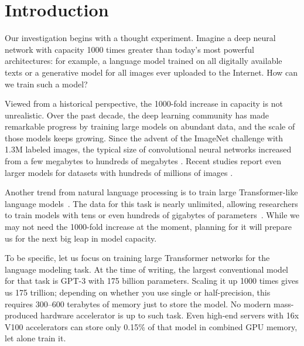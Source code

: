 \vspace{-12pt}
\section{Introduction}\label{sect:intro}
\vspace{-4pt}

Our investigation begins with a thought experiment. Imagine a deep neural network with capacity 1000 times greater than today's most powerful architectures: for example, a language model trained on all digitally available texts or a generative model for all images ever uploaded to the Internet. How can we train such a model?

\vspace{-1.5pt}

Viewed from a historical perspective, the 1000-fold increase in capacity is not unrealistic. Over the past decade, the deep learning community has made remarkable progress by training large models on abundant data, and the scale of those models keeps growing. Since the advent of the ImageNet challenge \cite{imagenet_cvpr09} with 1.3M labeled images, the typical size of convolutional neural networks increased from a few megabytes to hundreds of megabytes \cite{alexnet, resnet, huang2019gpipe}. Recent studies report even larger models for datasets with hundreds of millions of images \cite{kolesnikovlarge, jft300data}.

\vspace{-1.5pt}

Another trend from natural language processing is to train large Transformer-like language models~\cite{bert, roberta, kaplan2020scaling}. The data for this task is nearly unlimited, allowing researchers to train models with tens or even hundreds of gigabytes of parameters~\cite{brown2020language,shoeybi2019megatron,zellers2019defending,tnlg}. While we may not need the 1000-fold increase at the moment, planning for it will prepare us for the next big leap in model capacity.

\vspace{-1.5pt}

To be specific, let us focus on training large Transformer networks for the language modeling task. At the time of writing, the largest conventional model for that task is GPT-3 with 175 billion parameters. Scaling it up 1000 times gives us 175 trillion; depending on whether you use single or half-precision, this requires 300--600 terabytes of memory just to store the model. No modern mass-produced hardware accelerator is up to such task. Even high-end servers with 16x V100 accelerators can store only 0.15\% of that model in combined GPU memory, let alone train it.


